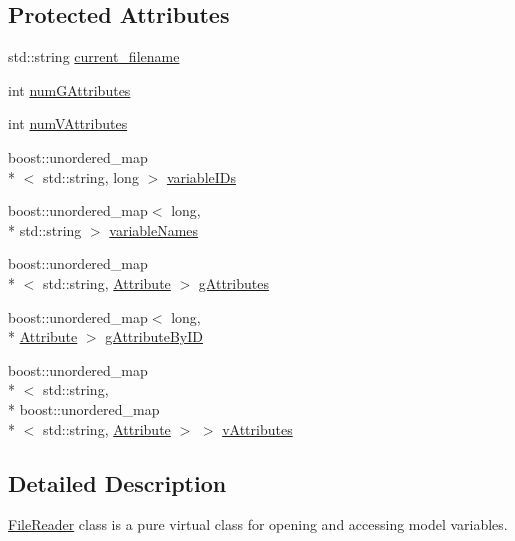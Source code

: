 \subsection*{Protected Attributes}
\begin{DoxyCompactItemize}
\item 
std\-::string \hyperlink{classccmc_1_1_file_reader_a2afb0635bf14f222991efc4d63e5f17a}{current\-\_\-filename}
\item 
int \hyperlink{classccmc_1_1_file_reader_a783e31e2f08cade8e52842f752c796ea}{num\-G\-Attributes}
\item 
int \hyperlink{classccmc_1_1_file_reader_a9e1e8aee145ed817cf02f293c244cc03}{num\-V\-Attributes}
\item 
boost\-::unordered\-\_\-map\\*
$<$ std\-::string, long $>$ \hyperlink{classccmc_1_1_file_reader_af87bd665411c9c8ce943040ff5b13055}{variable\-I\-Ds}
\item 
boost\-::unordered\-\_\-map$<$ long, \\*
std\-::string $>$ \hyperlink{classccmc_1_1_file_reader_a94d580d26fd966be477efb3fd9877ea9}{variable\-Names}
\item 
boost\-::unordered\-\_\-map\\*
$<$ std\-::string, \hyperlink{classccmc_1_1_attribute}{Attribute} $>$ \hyperlink{classccmc_1_1_file_reader_a5bf4b49e31f23ce0d5a0098809ea464a}{g\-Attributes}
\item 
boost\-::unordered\-\_\-map$<$ long, \\*
\hyperlink{classccmc_1_1_attribute}{Attribute} $>$ \hyperlink{classccmc_1_1_file_reader_a4225f8abbbb74ca9a18b9a0ea419f978}{g\-Attribute\-By\-I\-D}
\item 
boost\-::unordered\-\_\-map\\*
$<$ std\-::string, \\*
boost\-::unordered\-\_\-map\\*
$<$ std\-::string, \hyperlink{classccmc_1_1_attribute}{Attribute} $>$ $>$ \hyperlink{classccmc_1_1_file_reader_a1eb038b0d8cb945df2b02c4cb63d0aa3}{v\-Attributes}
\end{DoxyCompactItemize}


\subsection{Detailed Description}
\hyperlink{classccmc_1_1_file_reader}{File\-Reader} class is a pure virtual class for opening and accessing model variables. 

